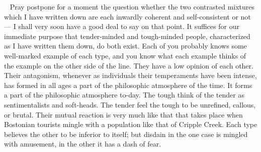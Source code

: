 \documentclass[12pt]{article}
\newcounter{wjparagraph}[section]
\newcommand*{\wjparagraph}{\stepcounter{wjparagraph}~\marginpar{\tiny\arabic{wjparagraph} }}
\begin{document}
\noindent {}\hfill {}

\bigskip

\wjparagraph
Pray postpone for a moment the question whether the two contrasted mixtures which I have written down are each inwardly coherent and self-consistent or not--- I shall very soon have a good deal to say on that point. It suffices for our immediate purpose that tender-minded and tough-minded people, characterized as I have written them down, do both exist. Each of you probably knows some well-marked example of each type, and you know what each example thinks of the example on the other side of the line. They have a low opinion of each other. Their antagonism, whenever as individuals their temperaments have been intense, has formed in all ages a part of the philosophic atmosphere of the time. It forms a part of the philosophic atmosphere to-day. The tough think of the tender as sentimentalists and soft-heads. The tender feel the tough to be unrefined, callous, or brutal. Their mutual reaction is very much like that that takes place when Bostonian tourists mingle with a population like that of Cripple Creek. Each type believes the other to be inferior to itself; but disdain in the one case is mingled with amusement, in the other it has a dash of fear.
\end{document}
